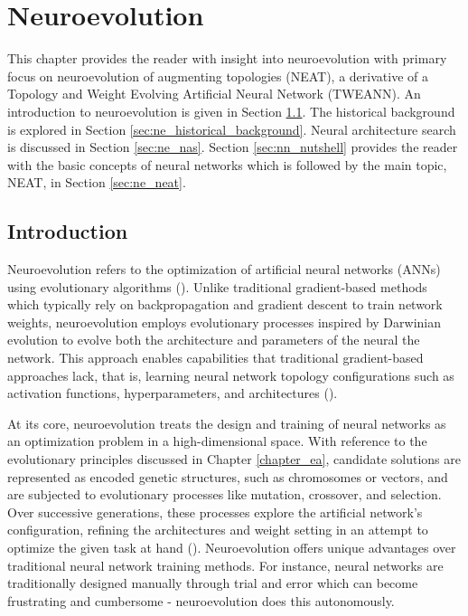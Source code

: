 \chapter{Neuroevolution}\label{chapter:neuroevolution}
This chapter provides the reader with insight into neuroevolution with primary focus on neuroevolution of augmenting topologies (NEAT), a derivative of a Topology and Weight Evolving Artificial Neural Network (TWEANN). An introduction to neuroevolution is given in Section \ref{sec:ne_introduction}. The historical background is explored in Section \ref{sec:ne_historical_background}. Neural architecture search is discussed in Section \ref{sec:ne_nas}. Section \ref{sec:nn_nutshell} provides the reader with the basic concepts of neural networks which is followed by the main topic, NEAT, in Section \ref{sec:ne_neat}.

\section{Introduction}\label{sec:ne_introduction}
Neuroevolution refers to the optimization of artificial neural networks (ANNs) using evolutionary algorithms (\cite{risi2015neuroevolution}). Unlike traditional gradient-based methods which typically rely on backpropagation and gradient descent to train network weights, neuroevolution employs evolutionary processes inspired by Darwinian evolution to evolve both the architecture and parameters of the neural the network. This approach enables capabilities that traditional gradient-based approaches lack, that is, learning neural network topology configurations such as activation functions, hyperparameters, and architectures (\cite{stanley2019designing}). 
\bigskip

\noindent At its core, neuroevolution treats the design and training of neural networks as an optimization problem in a high-dimensional space. With reference to the evolutionary principles discussed in Chapter \ref{chapter_ea}, candidate solutions are represented as encoded genetic structures, such as chromosomes or vectors, and are subjected to evolutionary processes like mutation, crossover, and selection. Over successive generations, these processes explore the artificial network's configuration, refining the architectures and weight setting in an attempt to optimize the given task at hand (\cite{risi2015neuroevolution}). Neuroevolution offers unique advantages over traditional neural network training methods. For instance, neural networks are traditionally designed manually through trial and error which can become frustrating and cumbersome - neuroevolution does this autonomously. \bigskip

